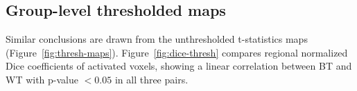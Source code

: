 \documentclass[conference]{IEEEtran}
\begin{document}
  
  \begin{figure}[ht]
  \end{figure}

  \subsection{Group-level thresholded maps}

  Similar conclusions are drawn from the unthresholded t-statistics maps
  (Figure~\ref{fig:thresh-maps}).  Figure~\ref{fig:dice-thresh} compares regional normalized Dice coefficients of
  activated voxels, showing a linear correlation between BT and WT with
  p-value $< 0.05$ in all three pairs.
  
\end{document}
